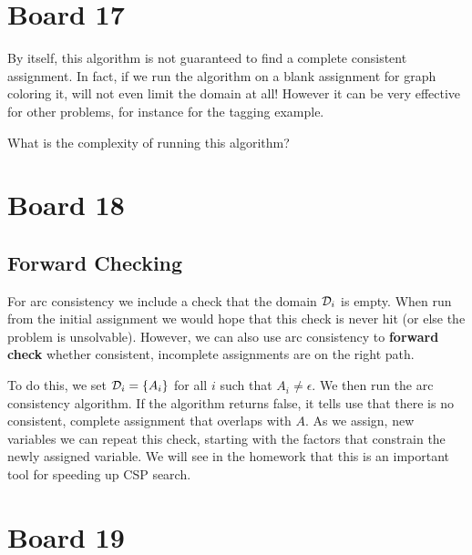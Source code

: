 \documentclass[10pt]{article}
\begin{document}
\section{Board 17}

By itself, this algorithm is not guaranteed to find a complete consistent assignment. In fact, if we run the algorithm on a blank assignment for graph coloring it, will not even limit the domain at all! However it can be very effective for other problems, for instance for the tagging example. 

\begin{exercise}
  What is the complexity of running this algorithm?
\end{exercise}

\section{Board 18}

\subsection{Forward Checking}

For arc consistency we include a check that the domain $\mathcal{D}_i$ is
empty. When run from the initial assignment we would hope that this
check is never hit (or else the problem is unsolvable). However, we
can also use arc consistency to \textbf{forward check} whether consistent, 
incomplete assignments are on the right path. 

To do this, we set $\mathcal{D}_i = \{A_i\}$ for all $i$ such that
$A_i \neq \epsilon$.  We then run the arc consistency algorithm. If
the algorithm returns false, it tells use that there is no consistent,
complete assignment that overlaps with $A$. As we assign, new
variables we can repeat this check, starting with the factors that
constrain the newly assigned variable. We will see in the homework
that this is an important tool for speeding up CSP search.

\section{Board 19}
\end{document}
